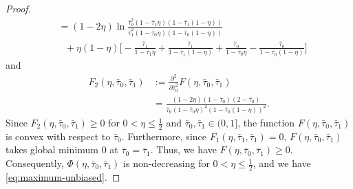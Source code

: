 \documentclass[journal,draftcls, onecolumn]{IEEEtran}
\begin{document}
\begin{proof}
\begin{align*}
&= (1-2\eta)\ln \frac{\bar{\tau}_0^2(1-\bar{\tau}_1\eta)(1-\bar{\tau}_1(1-\eta))}{\bar{\tau}_1^2(1-\bar{\tau}_0\eta)(1-\bar{\tau}_0(1-\eta))} \\
&~~~ + \eta(1-\eta)\bigg[-\frac{\bar{\tau}_1}{1-\bar{\tau}_1\eta} + \frac{\bar{\tau}_1}{1-\bar{\tau}_1(1-\eta)} + \frac{\bar{\tau}_0}{1-\bar{\tau}_0\eta} - \frac{\bar{\tau}_0}{1-\bar{\tau}_0(1-\eta)} \bigg]
\end{align*}
and
\begin{align*}
F_2(\eta,\bar{\tau}_0,\bar{\tau}_1) &:= \frac{\partial^2}{\partial \bar{\tau}_0^2} F(\eta,\bar{\tau}_0,\bar{\tau}_1)  \\
&= \frac{(1-2\eta)(1-\bar{\tau}_0)(2-\bar{\tau}_0)}{\bar{\tau}_0(1-\bar{\tau}_0\eta)^2(1-\bar{\tau}_0(1-\eta))^2}.
\end{align*}
Since $F_2(\eta,\bar{\tau}_0,\bar{\tau}_1) \ge 0$ for $0<\eta\le \frac{1}{2}$ and $\bar{\tau}_0,\bar{\tau}_1\in (0,1]$, 
the function $F(\eta,\bar{\tau}_0,\bar{\tau}_1)$ is convex with respect to $\bar{\tau}_0$.
Furthermore, since $F_1(\eta,\bar{\tau}_1,\bar{\tau}_1)=0$, $F(\eta,\bar{\tau}_0,\bar{\tau}_1)$ takes global minimum $0$ at $\bar{\tau}_0=\bar{\tau}_1$.
Thus, we have $F(\eta,\bar{\tau}_0,\bar{\tau}_1) \ge 0$. Consequently, $\Phi(\eta,\bar{\tau}_0,\bar{\tau}_1)$ is non-decreasing
for $0<\eta \le \frac{1}{2}$, and we have \eqref{eq:maximum-unbiased}.
\end{proof}
\end{document}
